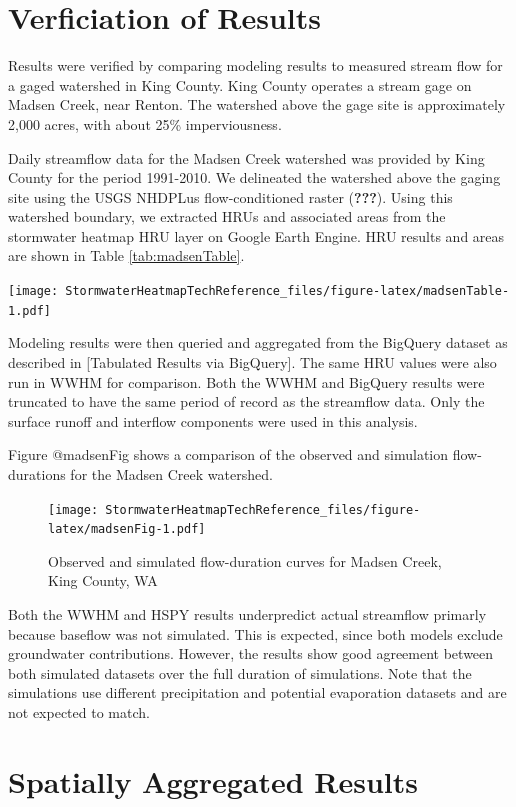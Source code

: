 \documentclass[
]{report}
\begin{document}
\hypertarget{verficiation-of-results}{%
\section{Verficiation of Results}\label{verficiation-of-results}}

Results were verified by comparing modeling results to measured stream flow for a gaged watershed in King County. King County operates a stream gage on Madsen Creek, near Renton. The watershed above the gage site is approximately 2,000 acres, with about 25\% imperviousness.

Daily streamflow data for the Madsen Creek watershed was provided by King County for the period 1991-2010. We delineated the watershed above the gaging site using the USGS NHDPLus flow-conditioned raster ({\textbf{???}}).
Using this watershed boundary, we extracted HRUs and associated areas from the stormwater heatmap HRU layer on Google Earth Engine. HRU results and areas are shown in Table \ref{tab:madsenTable}.

\texttt{[image: StormwaterHeatmapTechReference\_files/figure-latex/madsenTable-1.pdf]}

Modeling results were then queried and aggregated from the BigQuery dataset as described in {[}Tabulated Results via BigQuery{]}. The same HRU values were also run in WWHM for comparison. Both the WWHM and BigQuery results were truncated to have the same period of record as the streamflow data. Only the surface runoff and interflow components were used in this analysis.

Figure @madsenFig shows a comparison of the observed and simulation flow-durations for the Madsen Creek watershed.

\begin{figure}
\centering
\texttt{[image: StormwaterHeatmapTechReference\_files/figure-latex/madsenFig-1.pdf]}
\caption{\label{fig:madsenFig}Observed and simulated flow-duration curves for Madsen Creek, King County, WA}
\end{figure}

Both the WWHM and HSPY results underpredict actual streamflow primarly because baseflow was not simulated. This is expected, since both models exclude groundwater contributions. However, the results show good agreement between both simulated datasets over the full duration of simulations. Note that the simulations use different precipitation and potential evaporation datasets and are not expected to match.

\hypertarget{spatially-aggregated-results}{%
\section{Spatially Aggregated Results}\label{spatially-aggregated-results}}
\end{document}
